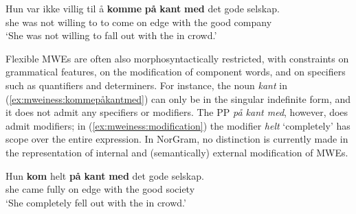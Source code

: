 \documentclass[output=paper]{langsci/langscibook}
\begin{document}

\ea\label{ex:mweiness:kommepåkantmed}
\gll Hun var ikke villig til å \textbf{komme} \textbf{på} \textbf{kant} \textbf{med} det gode selskap. \\
     she was not willing to to come on edge with the good company \\
\glt `She was not willing to fall out with the in crowd.’
\z

Flexible MWEs are often also morphosyntactically restricted, with constraints on grammatical features, on the modification of component words, and on specifiers such as quantifiers and determiners.
For instance, the noun \emph{kant} in (\ref{ex:mweiness:kommepåkantmed}) can only be in the singular indefinite form, and it does not admit any specifiers or modifiers.
The PP \emph{på kant med}, however, does admit modifiers; in (\ref{ex:mweiness:modification}) the modifier \emph{helt} `completely' has scope over the entire expression.
In NorGram, no distinction is currently made in the representation of internal and (semantically) external modification of MWEs. 

\ea\label{ex:mweiness:modification}
\gll Hun \textbf{kom} helt \textbf{på} \textbf{kant} \textbf{med} det gode selskap. \\
she came fully on edge with the good society \\
\glt `She completely fell out with the in crowd.' \\
\z
\end{document}
